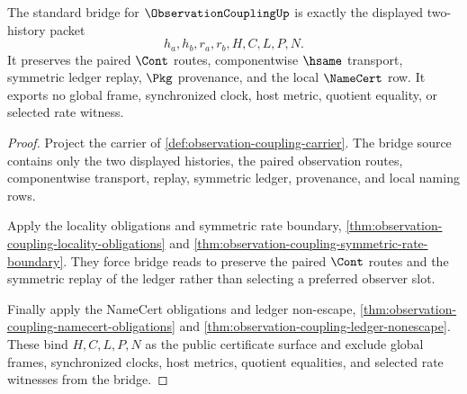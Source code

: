 \begin{theorem}
\label{thm:observation-coupling-standard-bridge-boundary}
The standard bridge for $\ObservationCouplingUp$ is exactly the displayed
two-history packet
$$
h_a,h_b,r_a,r_b,H,C,L,P,N.
$$
It preserves the paired $\Cont$ routes, componentwise $\hsame$ transport,
symmetric ledger replay, $\Pkg$ provenance, and the local $\NameCert$ row. It
exports no global frame, synchronized clock, host metric, quotient equality, or
selected rate witness.
\end{theorem}
\begin{proof}
Project the carrier of \autoref{def:observation-coupling-carrier}. The bridge
source contains only the two displayed histories, the paired observation
routes, componentwise transport, replay, symmetric ledger, provenance, and
local naming rows.

Apply the locality obligations and symmetric rate boundary,
\autoref{thm:observation-coupling-locality-obligations} and
\autoref{thm:observation-coupling-symmetric-rate-boundary}. They force bridge
reads to preserve the paired $\Cont$ routes and the symmetric replay of the
ledger rather than selecting a preferred observer slot.

Finally apply the NameCert obligations and ledger non-escape,
\autoref{thm:observation-coupling-namecert-obligations} and
\autoref{thm:observation-coupling-ledger-nonescape}. These bind $H,C,L,P,N$ as
the public certificate surface and exclude global frames, synchronized clocks,
host metrics, quotient equalities, and selected rate witnesses from the bridge.
\end{proof}


